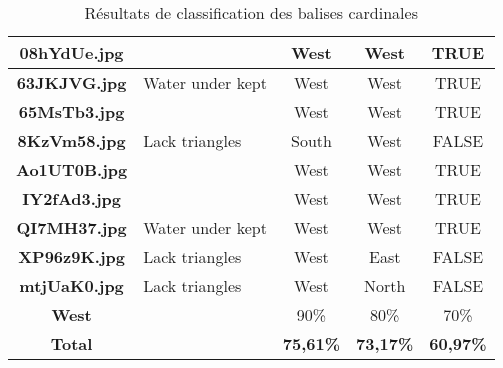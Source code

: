 \documentclass{article}
\begin{document}
\begin{table}[h!]
{\begin{tabular}{|c|p{4cm}|c|c|c|}
            \rowcolor{gray!10}
            \textbf{08hYdUe.jpg} &                              & West                          & West                             & TRUE                 \\ \hline
            \rowcolor{gray!0}
            \textbf{63JKJVG.jpg} & Water under kept             & West                          & West                             & TRUE                 \\ \hline
            \rowcolor{gray!10}
            \textbf{65MsTb3.jpg} &                              & West                          & West                             & TRUE                 \\ \hline
            \rowcolor{gray!0}
            \textbf{8KzVm58.jpg} & Lack triangles               & South                         & West                             & FALSE                \\ \hline
            \rowcolor{gray!10}
            \textbf{Ao1UT0B.jpg} &                              & West                          & West                             & TRUE                 \\ \hline
            \rowcolor{gray!0}
            \textbf{IY2fAd3.jpg} &                              & West                          & West                             & TRUE                 \\ \hline
            \rowcolor{gray!10}
            \textbf{QI7MH37.jpg} & Water under kept             & West                          & West                             & TRUE                 \\ \hline
            \rowcolor{gray!0}
            \textbf{XP96z9K.jpg} & Lack triangles               & West                          & East                             & FALSE                \\ \hline
            \rowcolor{gray!10}
            \textbf{mtjUaK0.jpg} & Lack triangles               & West                          & North                            & FALSE                \\ \hline
            \rowcolor{gray!40}
            \textbf{West}        &                              & 90\%                          & 80\%                             & 70\%                 \\ \hline
            \rowcolor{gray!40}
            \textbf{Total}       &                              & \textbf{75,61\%}              & \textbf{73,17\%}                 & \textbf{60,97\%}     \\ \hline
        \end{tabular}%
    }
    \caption{Résultats de classification des balises cardinales}\label{tab:segmentation_results}
\end{table}
\newpage
\end{document}
